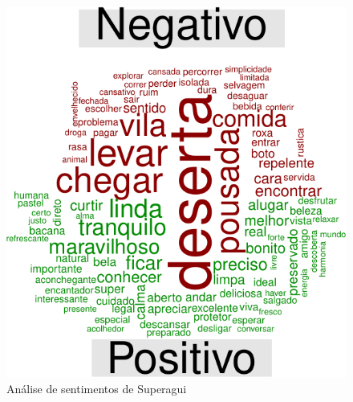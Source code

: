 \documentclass[preprint, 3p,
authoryear]{elsarticle} %
\begin{document}
\begin{figure}[H]

{\centering \includegraphics{bookdown-artigo_files/figure-latex/fig8-1} 

}

\caption{Análise de sentimentos de Superagui}\label{fig:fig8}
\end{figure}
\end{document}
